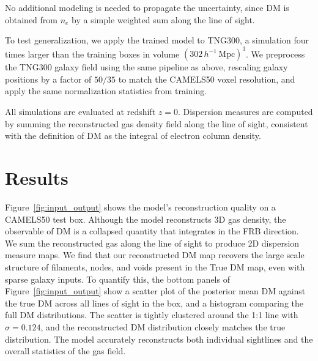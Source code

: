 \documentclass[twocolumn]{aastex631}
\begin{document}
No additional modeling is needed to propagate the uncertainty, since DM is obtained from $n_e$ by a simple weighted sum along the line of sight.

To test generalization, we apply the trained model to TNG300, a simulation four times larger than the training boxes in volume $(302\,h^{-1}\,\mathrm{Mpc})^3$. We preprocess the TNG300 galaxy field using the same pipeline as above, rescaling galaxy positions by a factor of $50/35$ to match the CAMELS50 voxel resolution, and apply the same normalization statistics from training.

All simulations are evaluated at redshift $z = 0$. Dispersion measures are computed by summing the reconstructed gas density field along the line of sight, consistent with the definition of DM as the integral of electron column density.

\figPatchHist

\section{Results}
\label{sec:results}
Figure~\ref{fig:input_output} shows the model's reconstruction quality on a CAMELS50 test box. Although the model reconstructs 3D gas density, 
the observable of DM is a collapsed quantity that integrates in the FRB direction. We sum the reconstructed gas along the line of sight to produce 2D dispersion measure maps. We find 
that our reconstructed DM map recovers the large scale structure of filaments, nodes, and voids present in the True DM map, even with sparse galaxy inputs. To quantify this, the bottom panels of Figure~\ref{fig:input_output} show a scatter plot of the posterior mean DM against the true DM across all lines of sight in the box, and a histogram comparing the full DM distributions. The scatter is tightly clustered around the 1:1 line with $\sigma = 0.124$, and the reconstructed DM distribution closely matches the true distribution. The model accurately reconstructs both individual sightlines and the overall statistics of the gas field.
\figRank
\end{document}
